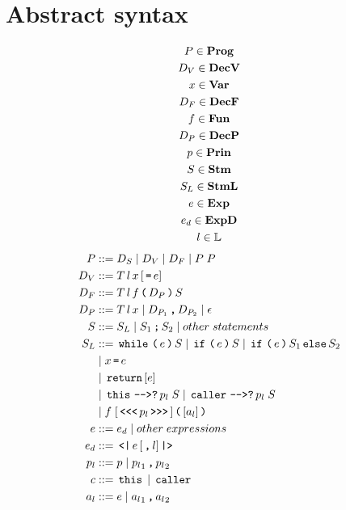 \section{Abstract syntax}

\begin{gather*}
  P   \in \mathbf{Prog}\\
  D_V \in \mathbf{DecV}\\
  x   \in \mathbf{Var}\\
  D_F \in \mathbf{DecF} \\
  f   \in \mathbf{Fun}\\
  D_P \in \mathbf{DecP}\\
  p   \in \mathbf{Prin}\\
  S   \in \mathbf{Stm}\\
  S_L \in \mathbf{StmL}\\
  e   \in \mathbf{Exp}\\
  e_d \in \mathbf{ExpD}\\
  l   \in \mathbb{L}\\
\end{gather*}
\begin{align*}
  P       & ::= D_S \gp D_V \gp D_F \gp P \; P \\
  D_V     & ::= T \, l \, x \, [\tk = e] \\
  D_F     & ::= T \, l \, f \tk ( D_P \tk ) S \\
  D_P     & ::= T \, l \, x \gp D_{P_1} \tk , D_{P_2} \gp \epsilon \\
  S       & ::= S_L \gp S_1 \tk ; S_2 \gp other \; statements \\
  S_L     & ::= \tk{while} \tk ( e \tk ) S \gp \tk{if} \tk ( e \tk ) S \gp \tk{if} \tk ( e \tk ) S_1 \tk{else} S_2 \\
          & \gp x \tk = e \\
          & \gp \tk{return} [e] \\
          & \gp \tk{this} \tk{-{}->?} p_l \; S \gp \tk{caller} \tk{-{}->?} p_l \; S \\
          & \gp f \; [\tk{<{}<{}<} p_l \tk{>{}>{}>}] \tk ( [a_l] \tk ) \\
  e       & ::= e_d \gp other \; expressions \\
  e_d     & ::= \tk{<|} e \, [\tk , l] \tk{|>} \\
  p_l     & ::= p \gp {p_l}_1 \tk , {p_l}_2 \\
  c       & ::= \tk{this} \gp \tk{caller} \\
  a_l     & ::= e \gp {a_l}_1 \tk , {a_l}_2
\end{align*}
